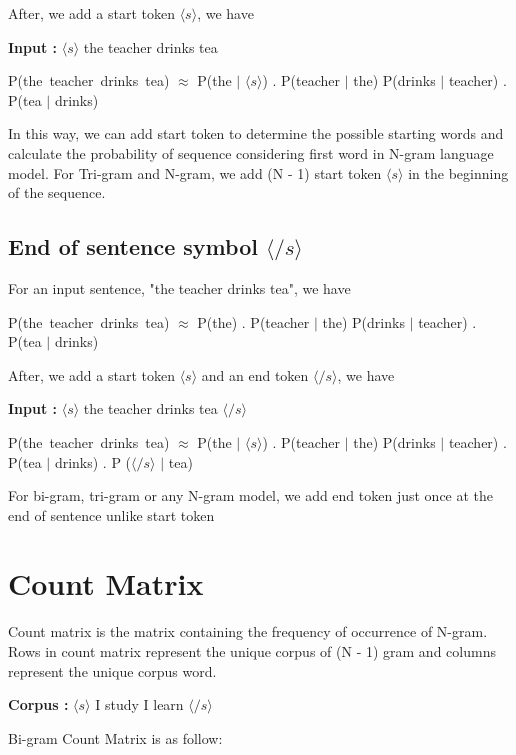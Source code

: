 After, we add a start token $\langle s \rangle$, we have

\textbf{Input : } $\langle s \rangle$ the teacher drinks tea

P(the\, teacher\, drinks\, tea) $\approx$ P(the \(|\) $\langle s \rangle$) . P(teacher \(|\) the) P(drinks \(|\) teacher) . P(tea \(|\) drinks)

In this way, we can add start token to determine the possible starting words and calculate the probability of sequence considering first word in N-gram language model. For Tri-gram and N-gram, we add (N - 1) start token $\langle s \rangle$ in the beginning of the sequence.

\subsection{End of sentence symbol $\langle /s \rangle$}
For an input sentence, "the teacher drinks tea", we have

P(the\, teacher\, drinks\, tea) $\approx$ P(the) . P(teacher \(|\) the) P(drinks \(|\) teacher) . P(tea \(|\) drinks)

After, we add a start token $\langle s \rangle$ and an end token $\langle /s \rangle$, we have

\textbf{Input : } $\langle s \rangle$ the teacher drinks tea $\langle /s \rangle$

P(the\, teacher\, drinks\, tea) $\approx$ P(the \(|\) $\langle s \rangle$) . P(teacher \(|\) the) P(drinks \(|\) teacher) . P(tea \(|\) drinks) . P ($\langle /s \rangle$ \(|\) tea)

For bi-gram, tri-gram or any N-gram model, we add end token just once at the end of sentence unlike start token


\section{Count Matrix}
Count matrix is the matrix containing the frequency of occurrence of N-gram. Rows in count matrix represent the unique corpus of (N - 1) gram and columns represent the unique corpus word.

\textbf{Corpus : } $\langle s \rangle$ I study I learn $\langle /s \rangle$

Bi-gram Count Matrix is as follow:

